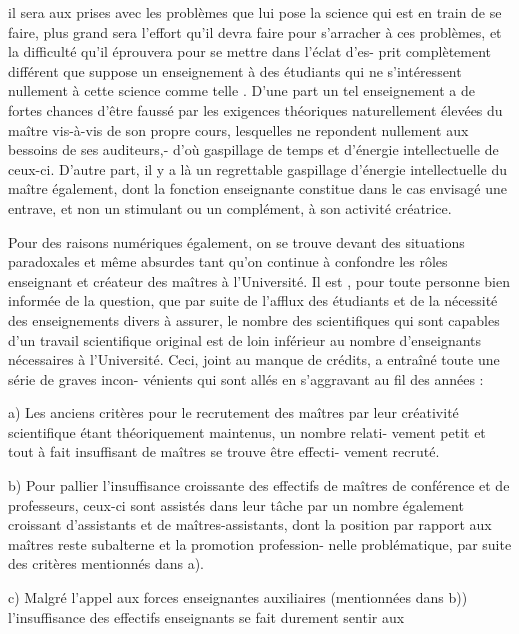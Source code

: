 
il sera aux prises avec les problèmes que lui pose la science qui est en train
de se faire, plus grand sera l'effort qu'il devra faire pour s'arracher à ces
problèmes, et la difficulté qu'il éprouvera pour se mettre dans l'éclat d'es-%
prit complètement différent que suppose un enseignement à des étudiants qui
ne s'intéressent nullement à cette science comme telle . D'une part un tel
enseignement a de fortes chances d'être faussé par les exigences théoriques
naturellement élevées du maître vis-à-vis de son propre cours, lesquelles
ne repondent nullement aux bessoins de ses auditeurs,- d'où gaspillage de
temps et d'énergie intellectuelle de ceux-ci. D'autre part, il y a là un
regrettable gaspillage d'énergie intellectuelle du maître également, dont
la fonction enseignante constitue dans le cas envisagé une entrave, et non
un stimulant ou un complément, à son activité créatrice.

Pour des raisons numériques également, on se trouve devant des
situations paradoxales et même absurdes tant qu'on continue à confondre les
rôles enseignant et créateur des maîtres à l'Université. Il est ,
pour toute personne bien informée de la question, que par suite de l'afflux
des étudiants et de la nécessité des enseignements divers à assurer, le
nombre des scientifiques qui sont capables d'un travail scientifique original
est de loin inférieur au nombre d'enseignants nécessaires à l'Université.
Ceci, joint au manque de crédits, a entraîné toute une série de graves incon-%
vénients qui sont allés en s'aggravant au fil des années :

a) Les anciens critères pour le recrutement des maîtres par leur
créativité scientifique étant théoriquement maintenus, un nombre relati-%
vement petit et tout à fait insuffisant de maîtres se trouve être effecti-%
vement recruté.

b) Pour pallier l'insuffisance croissante des effectifs de maîtres
de conférence et de professeurs, ceux-ci sont assistés dans leur tâche par
un nombre également croissant d'assistants et de maîtres-assistants, dont la
position par rapport aux maîtres reste subalterne et la promotion profession-%
nelle problématique, par suite des critères mentionnés dans a).

c) Malgré l'appel aux forces enseignantes auxiliaires (mentionnées
dans b)) l'insuffisance des effectifs enseignants se fait durement sentir aux

